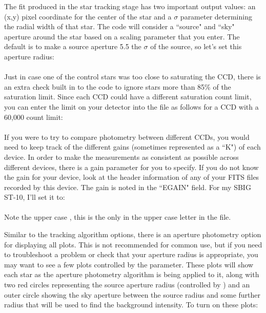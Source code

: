 \documentclass{article}
\begin{document}
	The fit produced in the star tracking stage has two important output values: an (x,y) pixel coordinate for the center of the star and a $ \sigma $ parameter determining the radial width of that star. The code will consider a ``source" and ``sky" aperture around the star based on a scaling parameter that you enter. The default is to make a source aperture 5.5 the $ \sigma $ of the source, so let's set this aperture radius:\\
	
	\indent {}\\
	
	Just in case one of the control stars was too close to saturating the CCD, there is an extra check built in to the code to ignore stars more than 85\% of the saturation limit. Since each CCD could have a different saturation count limit, you can enter the limit on your detector into the  file as follows for a CCD with a 60,000 count limit: \\
	
\indent {} \\

	If you were to try to compare photometry between different CCDs, you would need to keep track of the different gains (sometimes represented as a ``K") of each device. In order to make the measurements as consistent as possible across different devices, there is a gain parameter for you to specify. If you do not know the gain for your device, look at the header information of any of your FITS files recorded by this device. The gain is noted in the ``EGAIN" field. For my SBIG ST-10, I'll set it to:\\
	
\indent {} \\

\noindent Note the upper case , this is the only in the upper case letter in the  file. 

	Similar to the tracking algorithm options, there is an aperture photometry option for displaying all plots. This is not recommended for common use, but if you need to troubleshoot a problem or check that your aperture radius is appropriate, you may want to see a few plots controlled by the  parameter. These plots will show each star as the aperture photometry algorithm is being applied to it, along with two red circles representing the source aperture radius (controlled by ) and an outer circle showing the sky aperture between the source radius and some further radius that will be used to find the background intensity. To turn on these plots:\\
\end{document}
